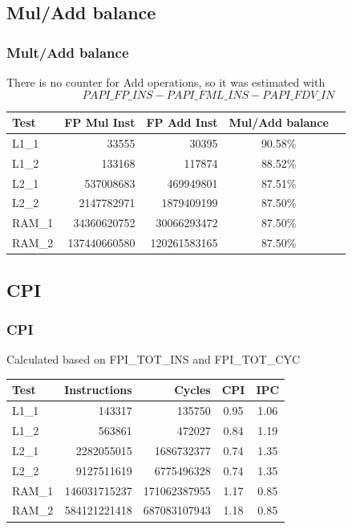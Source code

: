 \documentclass{beamer}
\begin{document}
\subsection{Mul/Add balance}
\begin{frame}
	\frametitle{Mult/Add balance}

	There is no counter for Add operations, so it was estimated with
	$$PAPI\_FP\_INS - PAPI\_FML\_INS - PAPI\_FDV\_IN$$

	\begin{table}[!htp]
		\begin{center}
		{\small
			\begin{tabular}{|l|r|r|c|c|}
				
				\hline
				Test	&	FP Mul Inst		&	FP Add Inst		&	Mul/Add balance	\\
				\hline
				L1\_1	&	33555			&	30395			&	90.58\%			\\
				L1\_2	&	133168			&	117874			&	88.52\%			\\
				L2\_1	&	537008683		&	469949801		&	87.51\%			\\
				L2\_2	&	2147782971		&	1879409199		&	87.50\%			\\
				RAM\_1	&	34360620752		&	30066293472		&	87.50\%			\\
				RAM\_2	&	137440660580	&	120261583165	&	87.50\%			\\
				\hline
			\end{tabular}
		}
		\end{center}
	\end{table}
\end{frame}

\subsection{CPI}
\begin{frame}
	\frametitle{CPI}

	Calculated based on FPI\_TOT\_INS and FPI\_TOT\_CYC

	\begin{table}[!htp]
		\begin{center}
		{\small
			\begin{tabular}{|l|r|r|c|c|}
				
				\hline
				Test	&	Instructions	&	Cycles			&	CPI		&	IPC		\\
				\hline
				L1\_1	&	143317			&	135750			&	0.95	&	1.06	\\
				L1\_2	&	563861			&	472027			&	0.84	&	1.19	\\
				L2\_1	&	2282055015		&	1686732377		&	0.74	&	1.35	\\
				L2\_2	&	9127511619		&	6775496328		&	0.74	&	1.35	\\
				RAM\_1	&	146031715237	&	171062387955	&	1.17	&	0.85	\\
				RAM\_2	&	584121221418	&	687083107943	&	1.18	&	0.85	\\
				\hline
			\end{tabular}
		}
		\end{center}
	\end{table}
\end{frame}
\end{document}
